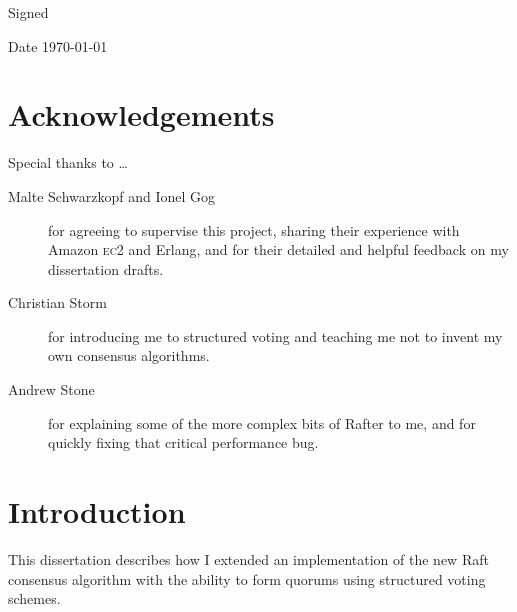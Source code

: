 \documentclass[12pt,chapterprefix=true,toc=bibliography,numbers=noendperiod,
               footnotes=multiple,twoside]{scrreprt}
\newcommand{\ECC}[0]{\textsc{ec}2 }
\begin{document}
\vspace{0.3in}
Signed

\vspace{0.2in}
Date \hspace{0.4in} \today



\chapter*{Acknowledgements}
\label{ch:acknowledgements}

Special thanks to \dots

\begin{description}
    \item[Malte Schwarzkopf and Ionel Gog] for agreeing to supervise this project, sharing their experience with Amazon \ECC and Erlang, and for their detailed and helpful feedback on my dissertation drafts.
    \item[Christian Storm] for introducing me to structured voting and teaching me not to invent my own consensus algorithms.
    \item[Andrew Stone] for explaining some of the more complex bits of Rafter to me, and for quickly fixing that critical performance bug.
\end{description}

\tableofcontents





\chapter{Introduction}
\label{ch:introduction}


This dissertation describes how I extended an implementation of the new Raft consensus algorithm with the ability to form quorums using structured voting schemes.

\end{document}

